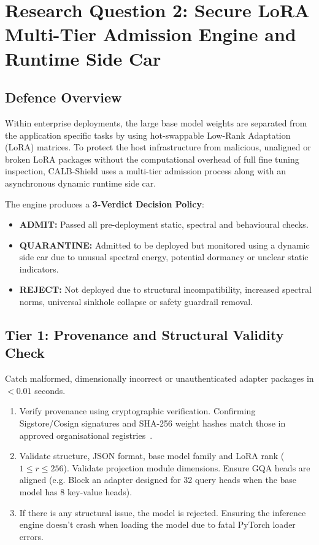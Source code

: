 \documentclass[conference]{IEEEtran}
\begin{document}
\section{Research Question 2: Secure LoRA Multi-Tier Admission Engine and Runtime Side Car}
\label{sec:method_rq2}

\subsection{Defence Overview}
\label{subsec:rq2_overview}

Within enterprise deployments, the large base model weights are separated from the application specific tasks by using hot-swappable Low-Rank Adaptation (LoRA) matrices. To protect the host infrastructure from malicious, unaligned or broken LoRA packages without the computational overhead of full fine tuning inspection, CALB-Shield uses a multi-tier admission process along with an asynchronous dynamic runtime side car.

The engine produces a \textbf{3-Verdict Decision Policy}:
\begin{itemize}
    \item \textbf{ADMIT:} Passed all pre-deployment static, spectral and behavioural checks.
    \item \textbf{QUARANTINE:} Admitted to be deployed but monitored using a dynamic side car due to unusual spectral energy, potential dormancy or unclear static indicators.
    \item \textbf{REJECT:} Not deployed due to structural incompatibility, increased spectral norms, universal sinkhole collapse or safety guardrail removal.
\end{itemize}



\subsection{Tier 1: Provenance and Structural Validity Check}
\label{subsec:tier1}

Catch malformed, dimensionally incorrect or unauthenticated adapter packages in $< 0.01$ seconds.
\begin{enumerate}
    \item Verify provenance using cryptographic verification. Confirming Sigstore/Cosign signatures and SHA-256 weight hashes match those in approved organisational registries~\cite{openssf2022sigstore}.
    \item Validate structure, JSON format, base model family and LoRA rank ($1 \le r \le 256$). Validate projection module dimensions. Ensure GQA heads are aligned (e.g. Block an adapter designed for 32 query heads when the base model has 8 key-value heads).
    \item If there is any structural issue, the model is rejected. Ensuring the inference engine doesn't crash when loading the model due to fatal PyTorch loader errors.
\end{enumerate}
\end{document}
